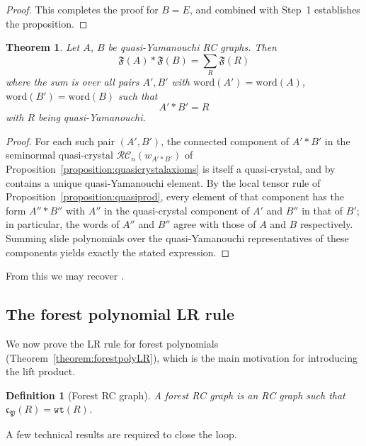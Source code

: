 \documentclass[pdflatex,sn-mathphys-num]{sn-jnl}
\numberwithin{equation}{subsection}
\newcommand{\wof}[1]{w_{#1}}
\newcommand{\wtt}{\mathtt{wt}}
\newcommand{\RC}{\mathcal{RC}}
\newcommand{\code}{\mathfrak{c}}
\newcommand{\forest}{\mathfrak{P}}
\theoremstyle{thmstyleone}
\newtheorem{theorem}{Theorem}[section]
\theoremstyle{thmstylethree}
\newtheorem{definition}[lemma]{Definition}
\theoremstyle{thmstyletwo}
\begin{document}
\begin{proof}
This completes the proof for $B = E$, and combined with Step~1 establishes the proposition.
\end{proof}


\begin{theorem} \label{theorem:slideproduct}
Let $A$, $B$ be quasi-Yamanouchi RC graphs. Then
$$\mathfrak{F}(A)*\mathfrak{F}(B) = \sum_{R} \mathfrak{F}(R)$$
where the sum is over all pairs $A',B'$ with $\mathrm{word}(A')=\mathrm{word}(A)$, $\mathrm{word}(B')=\mathrm{word}(B)$ such that 
$$A'*B'=R$$
with $R$ being quasi-Yamanouchi.
\end{theorem}
\begin{proof}
For each such pair $(A',B')$, the connected component of $A'*B'$ in the seminormal quasi-crystal $\RC_n(\wof{A'*B'})$ of Proposition~\ref{proposition:quasicrystalaxioms} is itself a quasi-crystal, and by \cite[Proposition~4.6]{cain2023quasicrystals} contains a unique quasi-Yamanouchi element. By the local tensor rule of Proposition~\ref{proposition:quasiprod}, every element of that component has the form $A''*B''$ with $A''$ in the quasi-crystal component of $A'$ and $B''$ in that of $B'$; in particular, the words of $A''$ and $B''$ agree with those of $A$ and $B$ respectively. Summing slide polynomials over the quasi-Yamanouchi representatives of these components yields exactly the stated expression.
\end{proof}

From this we may recover \cite[Theorem~5.11]{assaf2017slide}.

\subsection{The forest polynomial LR rule}\label{section:forestlrsub}

We now prove the LR rule for forest polynomials (Theorem~\ref{theorem:forestpolyLR}), which is the main motivation for introducing the lift product.
\begin{definition}[Forest RC graph]
A \emph{forest RC graph} is an RC graph such that $\code_\forest(R) = \wtt(R)$. 
\end{definition}

A few technical results are required to close the loop.
\end{document}
